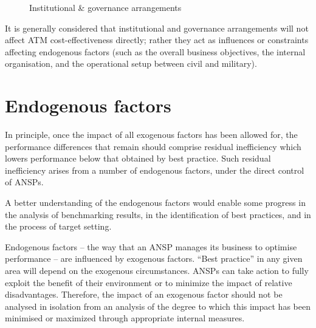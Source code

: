 \documentclass[
  11pt,
  a4paperpaper,
  openany,headsepline=on,footsepline=off,DIV=12,table]{scrbook}
\begin{document}
\begin{figure}[H]


\caption{\label{fig-institutional-arrangements}Institutional \&
governance arrangements}

\end{figure}%

It is generally considered that institutional and governance
arrangements will not affect ATM cost-effectiveness directly; rather
they act as influences or constraints affecting endogenous factors (such
as the overall business objectives, the internal organisation, and the
operational setup between civil and military).

\section{Endogenous factors}\label{endogenous-factors}

In principle, once the impact of all exogenous factors has been allowed
for, the performance differences that remain should comprise residual
inefficiency which lowers performance below that obtained by best
practice. Such residual inefficiency arises from a number of endogenous
factors, under the direct control of ANSPs.

A better understanding of the endogenous factors would enable some
progress in the analysis of benchmarking results, in the identification
of best practices, and in the process of target setting.

Endogenous factors -- the way that an ANSP manages its business to
optimise performance -- are influenced by exogenous factors. ``Best
practice'' in any given area will depend on the exogenous circumstances.
ANSPs can take action to fully exploit the benefit of their environment
or to minimize the impact of relative disadvantages. Therefore, the
impact of an exogenous factor should not be analysed in isolation from
an analysis of the degree to which this impact has been minimised or
maximized through appropriate internal measures.
\end{document}

